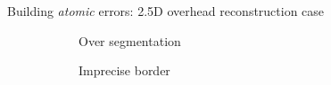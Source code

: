 \documentclass[export]{beamer}
\begin{document}
\begin{frame}{Building \textit{atomic} errors: 2.5D overhead reconstruction case}
\begin{figure}
\begin{center}
\begin{subfigure}{.28\textwidth}
                            \caption{\label{fig::bul_over} Over segmentation}
                        \end{subfigure}
                        \hspace{10pt}
                        \begin{subfigure}{.28\textwidth}
                            \caption{\label{fig::bul_footprint} Imprecise border}
                        \end{subfigure}
                        \hspace{10pt}
                        \begin{subfigure}{.28\textwidth}

\end{subfigure}
\end{center}
\end{figure}
\end{frame}
\end{document}
